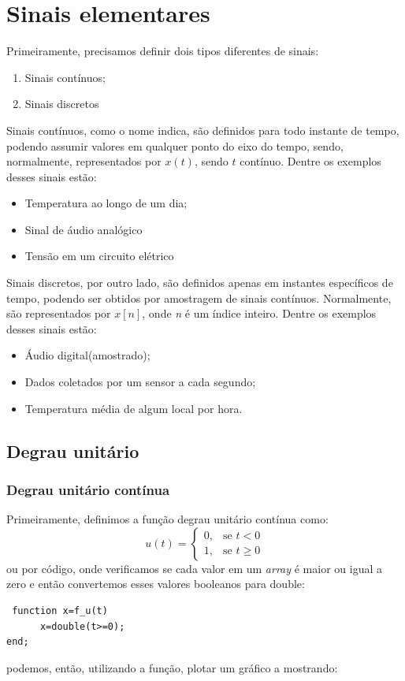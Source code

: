 \documentclass{article}
\begin{document}
\section{Sinais elementares}
Primeiramente, precisamos definir dois tipos diferentes de sinais:
\begin{enumerate}
  \item Sinais contínuos;
  \item Sinais discretos
\end{enumerate}
Sinais contínuos, como o nome indica, são definidos para todo instante de tempo, podendo assumir valores em qualquer ponto do eixo do tempo, sendo, normalmente, representados por \(x(t)\), sendo \(t\) contínuo.
Dentre os exemplos desses sinais estão:
\begin{itemize}
  \item Temperatura ao longo de um dia; 
  \item Sinal de áudio analógico
  \item Tensão em um circuito elétrico
\end{itemize}
Sinais discretos, por outro lado, são definidos apenas em instantes específicos de tempo, podendo ser obtidos por amostragem de sinais contínuos. Normalmente, são representados por \(x[n]\), onde \textit{n} é um índice inteiro.
Dentre os exemplos desses sinais estão:
\begin{itemize}
  \item Áudio digital(amostrado);
  \item Dados coletados por um sensor a cada segundo;
  \item Temperatura média de algum local por hora.
\end{itemize}

\subsection{Degrau unitário}
\subsubsection{Degrau unitário contínua}
Primeiramente, definimos a função degrau unitário contínua como:
\begin{equation}
  u(t)=\begin{cases}
    0, & \text{se $t<0$}\\
  1, & \text{se $t\geq0$}
  \label{eq:degrauUnitarioContinua}
  \end{cases}
\end{equation}
ou por código, onde verificamos se cada valor em um \textit{array} é maior ou igual a zero e então convertemos esses valores booleanos para double:
\begin{boxedd}
\begin{lstlisting}
 function x=f_u(t)
      x=double(t>=0);
end;
\end{lstlisting}
\end{boxedd}
podemos, então, utilizando a função, plotar um gráfico a mostrando:
\end{document}

